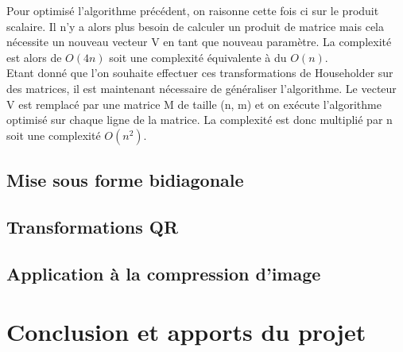 \documentclass{article}
\begin{document}
Pour optimisé l'algorithme précédent, on raisonne cette fois ci sur le produit scalaire. Il n'y a alors plus besoin de calculer un produit de matrice mais cela nécessite un nouveau vecteur V en tant que nouveau paramètre. La complexité est alors de ${O(4n)}$ soit une complexité équivalente à du ${O(n)}$. \\

Etant donné que l'on souhaite effectuer ces transformations de Householder sur des matrices, il est maintenant nécessaire de généraliser l'algorithme. Le vecteur V est remplacé par une matrice M de taille (n, m) et on exécute l'algorithme optimisé sur chaque ligne de la matrice. 
La complexité est donc multiplié par n soit une complexité ${O(n^2)}$. \\
   
\subsection*{Mise sous forme bidiagonale} 
   
\subsection*{Transformations QR}


\subsection*{Application à la compression d’image}
    

\section*{Conclusion et apports du projet}
\paragraph{}
\end{document}
